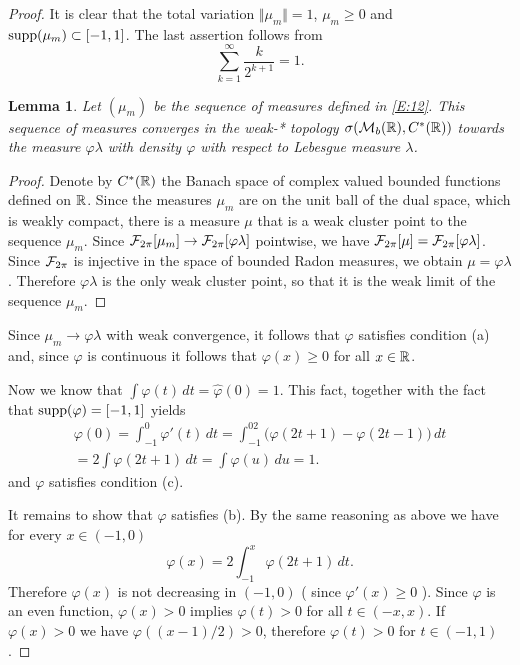 \documentclass[10pt]{amsart}
\newtheorem{lem}{Lemma}
\theoremstyle{definition}
\theoremstyle{remark}
\begin{document}
\begin{proof}
It is clear that the total variation $\Vert \mu_m\Vert=1$, $\mu_m\ge0$ and 
$\operatorname{supp}(\mu_m)\subset[-1,1]$. The last assertion follows from
\[\sum_{k=1}^\infty \frac{k}{2^{k+1}}=1.\]

\begin{lem}\label{L:1}
Let  $(\mu_m)$ be the sequence of measures defined in \eqref{E:12}. This
sequence of measures converges in the weak-* topology $\sigma(\mathcal M_b(\mathbb{R}),C^*(\mathbb{R}))$
towards the measure $\varphi\lambda$ with density $\varphi$ with 
respect to Lebesgue measure $\lambda$.
\end{lem}

\begin{proof} Denote by
$C^*(\mathbb{R})$ the Banach space of complex valued bounded functions defined on $\mathbb{R}$.
Since the measures $\mu_m$ are on the unit ball of the dual space, which is weakly compact, 
there is a measure $\mu$ that is a weak cluster point to the sequence $\mu_m$. Since
$\mathcal{F}_{2\pi}\!\left[\mu_m\right]\to \mathcal{F}_{2\pi}\!\left[\varphi\lambda\right]$ pointwise, we have
$\mathcal{F}_{2\pi}\!\left[\mu\right]=\mathcal{F}_{2\pi}\!\left[\varphi\lambda\right]$. Since
$\mathcal{F}_{2\pi}$ is injective in the space of bounded
Radon measures, we obtain $\mu=\varphi\lambda$. Therefore $\varphi\lambda$ is the only 
weak cluster point, so that it is the weak limit of the sequence $\mu_m$.
\end{proof}

Since $\mu_m\to\varphi\lambda$ with weak convergence, it follows that $\varphi$ satisfies 
condition (a) and, since $\varphi$ is continuous it follows that $\varphi(x)\ge0$ for 
all $x\in\mathbb{R}$.

Now we know that $\int\varphi(t)\,dt=\widehat\varphi(0)=1$. This fact, together 
with the fact that 
$\operatorname{supp}(\varphi)=[-1,1]$ yields
\begin{multline*}
\varphi(0)=\int_{-1}^0\varphi'(t)\,dt=\int_{-1}^02\bigl(\varphi(2t+1)-\varphi(2t-1)\bigr)\,dt\\
=2\int\varphi(2t+1)\,dt=\int\varphi(u)\,du=1.
\end{multline*}
and $\varphi$ satisfies condition (c).

It remains to show that $\varphi$ satisfies (b). By the same reasoning as above we have 
for every $x\in(-1,0)$
\begin{equation}\label{E:13}
\varphi(x)=2\int_{-1}^x \varphi(2t+1)\,dt.
\end{equation}
Therefore $\varphi(x)$ is not decreasing in $(-1,0)$ ( since $\varphi'(x)\ge0$ ).
Since $\varphi$ is an even function, $\varphi(x)>0$ implies $\varphi(t)>0$ for all 
$t\in(-x,x)$. If $\varphi(x)>0$ we have $\varphi((x-1)/2)>0$, therefore $\varphi(t)>0$
for $t\in(-1,1)$. 
\end{proof}
\end{document}
